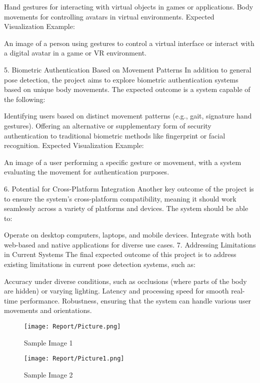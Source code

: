 \documentclass[a4paper,12pt]{report}
\begin{document}
Hand gestures for interacting with virtual objects in games or applications.
Body movements for controlling avatars in virtual environments.
Expected Visualization Example:

An image of a person using gestures to control a virtual interface or interact with a digital avatar in a game or VR environment.

5. Biometric Authentication Based on Movement Patterns
In addition to general pose detection, the project aims to explore biometric authentication systems based on unique body movements. The expected outcome is a system capable of the following:

Identifying users based on distinct movement patterns (e.g., gait, signature hand gestures).
Offering an alternative or supplementary form of security authentication to traditional biometric methods like fingerprint or facial recognition.
Expected Visualization Example:

An image of a user performing a specific gesture or movement, with a system evaluating the movement for authentication purposes.

6. Potential for Cross-Platform Integration
Another key outcome of the project is to ensure the system's cross-platform compatibility, meaning it should work seamlessly across a variety of platforms and devices. The system should be able to:

Operate on desktop computers, laptops, and mobile devices.
Integrate with both web-based and native applications for diverse use cases.
7. Addressing Limitations in Current Systems
The final expected outcome of this project is to address existing limitations in current pose detection systems, such as:

Accuracy under diverse conditions, such as occlusions (where parts of the body are hidden) or varying lighting.
Latency and processing speed for smooth real-time performance.
Robustness, ensuring that the system can handle various user movements and orientations.

\begin{figure}[h!]
    \centering
    \texttt{[image: Report/Picture.png]} %
    \caption{Sample Image 1}
    \label{fig:image1}
\end{figure}

\begin{figure}[h!]
    \centering
    \texttt{[image: Report/Picture1.png]} %
    \caption{Sample Image 2}
    \label{fig:image2}
    \end{figure}
\end{document}
